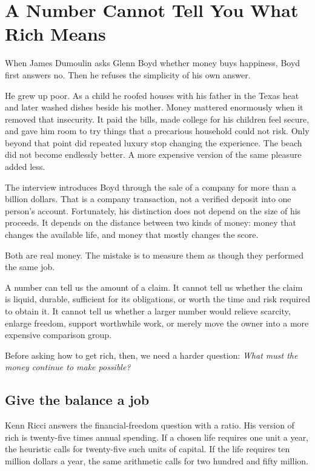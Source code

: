 \chapter{A Number Cannot Tell You What Rich Means}

When James Dumoulin asks Glenn Boyd whether money buys happiness, Boyd first
answers no. Then he refuses the simplicity of his own answer.

He grew up poor. As a child he roofed houses with his father in the Texas heat
and later washed dishes beside his mother. Money mattered enormously when it
removed that insecurity. It paid the bills, made college for his children feel
secure, and gave him room to try things that a precarious household could not
risk. Only beyond that point did repeated luxury stop changing the experience.
The beach did not become endlessly better. A more expensive version of the
same pleasure added less.

The interview introduces Boyd through the sale of a company for more than a
billion dollars. That is a company transaction, not a verified deposit into one
person's account. Fortunately, his distinction does not depend on the size of
his proceeds. It depends on the distance between two kinds of money: money
that changes the available life, and money that mostly changes the score.

Both are real money. The mistake is to measure them as though they performed
the same job.

A number can tell us the amount of a claim. It cannot tell us whether the claim
is liquid, durable, sufficient for its obligations, or worth the time and risk
required to obtain it. It cannot tell us whether a larger number would relieve
scarcity, enlarge freedom, support worthwhile work, or merely move the owner
into a more expensive comparison group.

Before asking how to get rich, then, we need a harder question:
\emph{What must the money continue to make possible?}

\section{Give the balance a job}

Kenn Ricci answers the financial-freedom question with a ratio. His version of
rich is twenty-five times annual spending. If a chosen life requires one unit a
year, the heuristic calls for twenty-five such units of capital. If the life
requires ten million dollars a year, the same arithmetic calls for two hundred
and fifty million.

